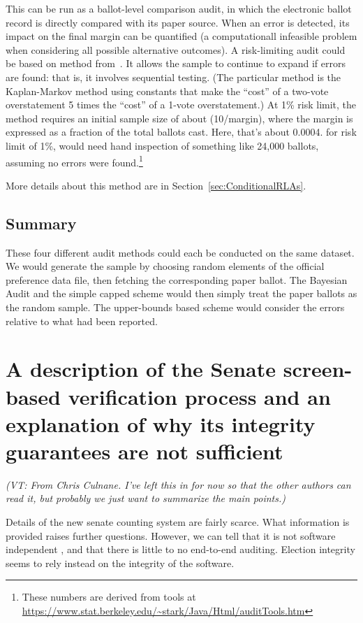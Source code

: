 \documentclass[10pt,a4paper]{article}
\newcommand{\VTNote}[1]{{\it(VT: #1)}}
\begin{document}
This can be run as a ballot-level comparison audit, in which the electronic ballot record is directly compared with its paper source.  When an error is detected, its impact on the final margin can be quantified  (a computationall infeasible problem when considering all possible alternative outcomes).  
A risk-limiting audit could be based on method from~\cite{stark2008conservative}.  It allows the sample to continue to expand if errors are found: that is, it involves sequential testing. (The particular method is the Kaplan-Markov method using constants that make the ``cost'' of a two-vote overstatement 5 times the ``cost'' of a 1-vote overstatement.) At 1\% risk limit, the method requires an initial sample size of about (10/margin), where the margin is expressed as a fraction of the total ballots cast. Here, that's about 0.0004.
for risk limit of 1\%, would need hand inspection of something like 24,000 ballots, assuming no errors were found.\footnote{These numbers are derived from tools at {\url{https://www.stat.berkeley.edu/~stark/Java/Html/auditTools.htm}} } 


More details about this method are in Section~\ref{sec:ConditionalRLAs}.

\subsection{Summary}
These four different audit methods could each be conducted on the same dataset.  We would generate the sample by choosing random elements of the official preference data file, then fetching the corresponding paper ballot.  The Bayesian Audit and the simple capped scheme would then simply treat the paper ballots as the random sample.  The upper-bounds based scheme would consider the errors relative to what had been reported.

\section{A description of the Senate screen-based verification process and an explanation of why its integrity guarantees are not sufficient}
\VTNote{From Chris Culnane.  I've left this in for now so that the other authors can read it, but probably we just want to summarize the main points.}

Details of the new senate counting system are fairly scarce. What information is provided raises further questions. However, we can tell that it is not software independent \cite{rivest08:e-vote}, and that there is little to no end-to-end auditing.  Election integrity seems to rely instead on the integrity of the software. 
\end{document}
